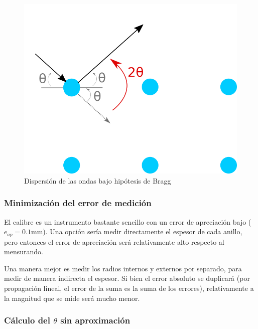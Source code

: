 \documentclass[]{article}
\begin{document}
\begin{figure}[H]
\centering
\includegraphics{cuestionario_e.svg.png}
\caption{Dispersión de las ondas bajo hipótesis de Bragg}
\end{figure}

\hypertarget{minimizaciuxf3n-del-error-de-mediciuxf3n}{%
\subsubsection{Minimización del error de
medición}\label{minimizaciuxf3n-del-error-de-mediciuxf3n}}

El calibre es un instrumento bastante sencillo con un error de
apreciación bajo (\(e_{ap} = 0.1\mathrm{mm}\)). Una opción sería medir
directamente el espesor de cada anillo, pero entonces el error de
apreciación será relativamente alto respecto al mensurando.

Una manera mejor es medir los radios internos y externos por separado,
para medir de manera indirecta el espesor. Si bien el error absoluto se
duplicará (por propagación lineal, el error de la suma es la suma de los
errores), relativamente a la magnitud que se mide será mucho menor.

\hypertarget{cuxe1lculo-del-theta-sin-aproximaciuxf3n}{%
\subsubsection{\texorpdfstring{Cálculo del \(\theta\) sin
aproximación}{Cálculo del \textbackslash{}theta sin aproximación}}\label{cuxe1lculo-del-theta-sin-aproximaciuxf3n}}
\end{document}
